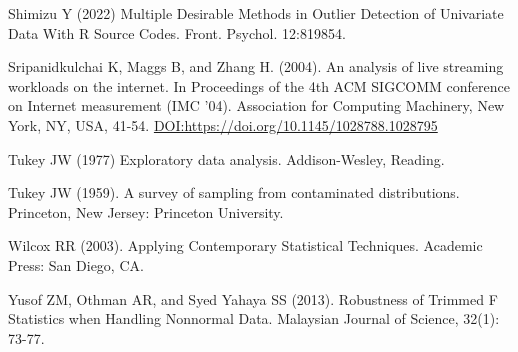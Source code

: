 \documentclass[
]{article}
\begin{document}
Shimizu Y (2022) Multiple Desirable Methods in Outlier Detection of
Univariate Data With R Source Codes. Front. Psychol. 12:819854.

Sripanidkulchai K, Maggs B, and Zhang H. (2004). An analysis of live
streaming workloads on the internet. In Proceedings of the 4th ACM
SIGCOMM conference on Internet measurement (IMC '04). Association for
Computing Machinery, New York, NY, USA, 41-54.
\url{DOI:https://doi.org/10.1145/1028788.1028795}

Tukey JW (1977) Exploratory data analysis. Addison-Wesley, Reading.

Tukey JW (1959). A survey of sampling from contaminated distributions.
Princeton, New Jersey: Princeton University.

Wilcox RR (2003). Applying Contemporary Statistical Techniques. Academic
Press: San Diego, CA.

Yusof ZM, Othman AR, and Syed Yahaya SS (2013). Robustness of Trimmed F
Statistics when Handling Nonnormal Data. Malaysian Journal of Science,
32(1): 73-77.
\end{document}
